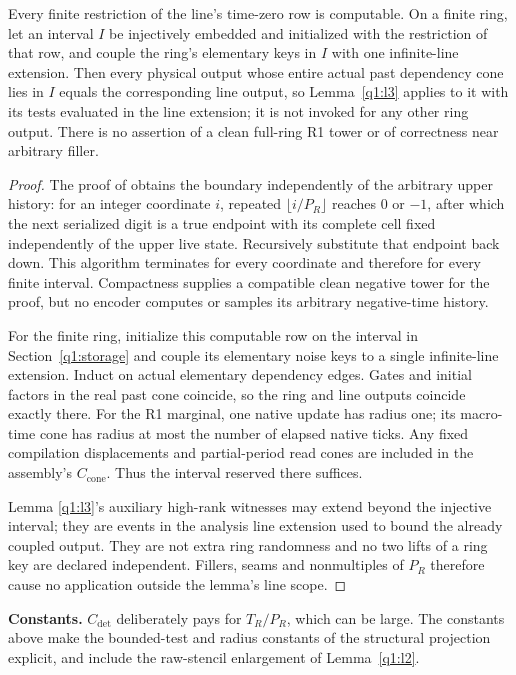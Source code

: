 \begin{lemma}\label{q1:l3.1}

Every finite restriction of the line's time-zero row is computable. On a finite ring, let an interval \(I\) be injectively embedded and initialized with the restriction of that row, and couple the ring's elementary keys in \(I\) with one infinite-line extension. Then every physical output whose entire actual past dependency cone lies in \(I\) equals the corresponding line output, so Lemma~\ref{q1:l3} applies to it with its tests evaluated in the line extension; it is not invoked for any other ring output. There is no assertion of a clean full-ring R1 tower or of correctness near arbitrary filler.

\end{lemma}
\begin{proof}
The proof of \cite[Lemma~\ref*{cl:lem:past}]{DMNoise1D2026} obtains the boundary independently of the arbitrary upper history: for an integer coordinate \(i\), repeated \(\lfloor i/P_{R}\rfloor\) reaches \(0\) or \(-1\), after which the next serialized digit is a true endpoint with its complete cell fixed independently of the upper live state. Recursively substitute that endpoint back down. This algorithm terminates for every coordinate and therefore for every finite interval. Compactness supplies a compatible clean negative tower for the proof, but no encoder computes or samples its arbitrary negative-time history.

For the finite ring, initialize this computable row on the interval in Section~\ref{q1:storage} and couple its elementary noise keys to a single infinite-line extension. Induct on actual elementary dependency edges. Gates and initial factors in the real past cone coincide, so the ring and line outputs coincide exactly there. For the R1 marginal, one native update has radius one; its macro-time cone has radius at most the number of elapsed native ticks. Any fixed compilation displacements and partial-period read cones are included in the assembly's \(C_{\mathrm{cone}}\). Thus the interval reserved there suffices.

Lemma \ref{q1:l3}'s auxiliary high-rank witnesses may extend beyond the injective interval; they are events in the analysis line extension used to bound the already coupled output. They are not extra ring randomness and no two lifts of a ring key are declared independent. Fillers, seams and nonmultiples of \(P_{R}\) therefore cause no application outside the lemma's line scope. 
\end{proof}

\textbf{Constants.} \(C_{\mathrm{det}}\) deliberately pays for \(T_{R}/P_{R}\), which can be large. The constants above make the bounded-test and radius constants of the structural projection explicit, and include the raw-stencil enlargement of Lemma~\ref{q1:l2}.
